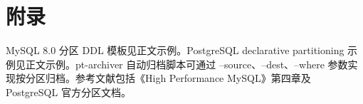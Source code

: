 \chapter{附录}
MySQL 8.0 分区 DDL 模板见正文示例。PostgreSQL declarative partitioning 示例见正文示例。pt-archiver 自动归档脚本可通过 --source、--dest、--where 参数实现按分区归档。参考文献包括《High Performance MySQL》第四章及 PostgreSQL 官方分区文档。\par
